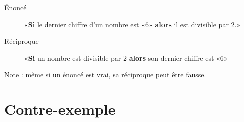 \begin{example}
    \begin{description}
        \item[Énoncé] «{\bf Si} le dernier chiffre d'un nombre est «\( 6\)» {\bf alors} il est divisible par \( 2\).» 
        \item[Réciproque] «{\bf Si} un nombre est divisible par \( 2\) {\bf alors} son dernier chiffre est «\( 6\)» 
    \end{description}
    Note : même si un énoncé est vrai, sa réciproque peut être fausse.
\end{example}

\section{Contre-exemple}

